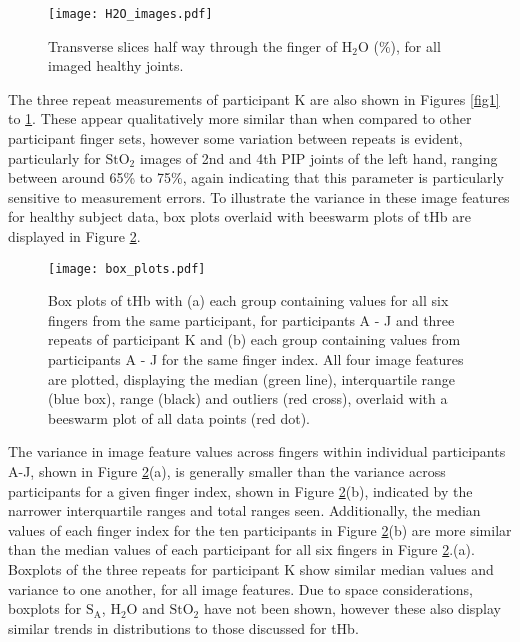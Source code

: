 \documentclass[twoside]{bhamthesis}
\theoremstyle{definition}
\begin{document}
\begin{figure}[!ht]
\centering\texttt{[image: H2O\_images.pdf]}
\caption{Transverse slices half way through the finger of $\mathrm{H_2O}$ (\%), for all imaged healthy joints.}
\label{fig4}
\end{figure}

The three repeat measurements of participant K are also shown in Figures \ref{fig1} to \ref{fig4}. These appear qualitatively more similar than when compared to other participant finger sets, however some variation between repeats is evident, particularly for $\mathrm{StO_2}$ images of 2nd and 4th PIP joints of the left hand, ranging between around 65\% to 75\%, again indicating that this parameter is particularly sensitive to measurement errors. To illustrate the variance in these image features for healthy subject data, box plots overlaid with beeswarm plots of tHb are displayed in Figure \ref{box_plots}.

\begin{figure}[!ht]
\centering\texttt{[image: box\_plots.pdf]}
\caption{Box plots of tHb with (a) each group containing values for all six fingers from the same participant, for participants A - J and three repeats of participant K and (b) each group containing values from participants A - J for the same finger index. All four image features are plotted, displaying the median (green line), interquartile range (blue box), range (black) and outliers (red cross), overlaid with a beeswarm plot of all data points (red dot).}
\label{box_plots}
\end{figure}

The variance in image feature values across fingers within individual participants A-J, shown in Figure \ref{box_plots}(a), is generally smaller than the variance across participants for a given finger index, shown in Figure \ref{box_plots}(b), indicated by the narrower interquartile ranges and total ranges seen. Additionally, the median values of each finger index for the ten participants in Figure \ref{box_plots}(b) are more similar than the median values of each participant for all six fingers in Figure \ref{box_plots}.(a). Boxplots of the three repeats for participant K show similar median values and variance to one another, for all image features. Due to space considerations, boxplots for $\mathrm{S_A}$, $\mathrm{H_2O}$ and $\mathrm{StO_2}$ have not been shown, however these also display similar trends in distributions to those discussed for tHb.
\end{document}
